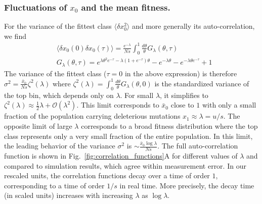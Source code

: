 \documentclass[rmp,preprint]{revtex4}
\newcommand{\FIG}[1]{Fig.~\ref{fig:#1}}
\newcommand{\x}{x}
\newcommand{\xs}{\bar{\x}}
\newcommand{\dx}{\delta \x}
\newcommand{\mr}[1]{\psi^{(#1)}}
\newcommand{\ml}[1]{\phi^{(#1)}}
\newcommand{\mut}{u}
\newcommand{\la}{\langle}
\newcommand{\ra}{\rangle}
\begin{document}
\subsubsection*{Fluctuations of $\x_0$ and the mean fitness.}
For the variance of the fittest class $\la \dx_0^2\ra$ and more generally its auto-correlation, we find
\begin{equation}
\begin{split}
\label{eq:variance}
&\langle \dx_0(0) \dx_0(\tau)\rangle = %
 \frac{e^{-\lambda}}{Ns} \int_0^1 \frac{d\theta}{\theta} G_\lambda(\theta,\tau)  \\
&G_\lambda(\theta,\tau) = e^{\lambda \theta^2e^{-\tau} -\lambda(1+e^{-\tau}) \theta}-e^{-\lambda \theta}-e^{-\lambda \theta e^{-\tau}}+1
\end{split}
\end{equation}
The variance of the fittest class ($\tau=0$ in the above expression) is therefore $\sigma^2 = \frac{\bar{x}_0}{Ns}\zeta^2(\lambda)$ where $\zeta^2(\lambda) = \int_0^1 \frac{d\theta}{\theta} G_\lambda(\theta,0)$ is the standardized  variance of the top bin, which depends only on $\lambda$. 
For small $\lambda$, it simplifies to $\zeta^2(\lambda)\approx \frac{ 1}{2}\lambda+\mathcal{O}(\lambda^2)$. This limit corresponds to $\xs_0$ close to $1$ with only a small fraction of the population carrying deleterious mutations $\x_1\approx \lambda = \mut/s$. The opposite limit of large $\lambda$ corresponds to a broad fitness distribution where the top class represents only a very small fraction of the entire population. In this limit, the leading behavior of the variance $\sigma^2$ is $\sim \frac{\xs_0\log \lambda}{Ns}$.
The full auto-correlation function is shown in \FIG{correlation_functions}A for different values of $\lambda$ and compared to simulation results, which agree within measurement error. In our rescaled units, the correlation functions decay over a time of order $1$, corresponding to a time of order $1/s$ in real time. More precisely, the decay time (in scaled units) increases with increasing $\lambda$ as $\log \lambda$. 
\end{document}
